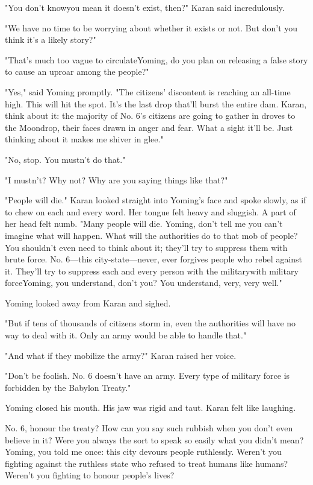 "You don't know\el you mean it doesn't exist, then?" Karan said
incredulously.

"We have no time to be worrying about whether it exists or not. But
don't you think it's a likely story?"

"That's much too vague to circulate\el Yoming, do you plan on releasing
a false story to cause an uproar among the people?"

"Yes," said Yoming promptly. "The citizens' discontent is reaching an
all-time high. This will hit the spot. It's the last drop that'll burst
the entire dam. Karan, think about it: the majority of No. 6's citizens
are going to gather in droves to the Moondrop, their faces drawn in
anger and fear. What a sight it'll be. Just thinking about it makes me
shiver in glee."

"No, stop. You mustn't do that."

"I mustn't? Why not? Why are you saying things like that?"

"People will die." Karan looked straight into Yoming's face and spoke
slowly, as if to chew on each and every word. Her tongue felt heavy and
sluggish. A part of her head felt numb. "Many people will die. Yoming,
don't tell me you can't imagine what will happen. What will the
authorities do to that mob of people? You shouldn't even need to think
about it; they'll try to suppress them with brute force. No. 6---this
city-state---never, ever forgives people who rebel against it. They'll try
to suppress each and every person with the military\el with military
force\el Yoming, you understand, don't you? You understand, very, very
well."

Yoming looked away from Karan and sighed.

"But if tens of thousands of citizens storm in, even the authorities
will have no way to deal with it. Only an army would be able to handle
that."

"And what if they mobilize the army?" Karan raised her voice.

"Don't be foolish. No. 6 doesn't have an army. Every type of military
force is forbidden by the Babylon Treaty."

Yoming closed his mouth. His jaw was rigid and taut. Karan felt like
laughing.

No. 6, honour the treaty? How can you say such rubbish when you don't
even believe in it? Were you always the sort to speak so easily what you
didn't mean? Yoming, you told me once: this city devours people
ruthlessly. Weren't you fighting against the ruthless state who refused
to treat humans like humans? Weren't you fighting to honour people's
lives?

